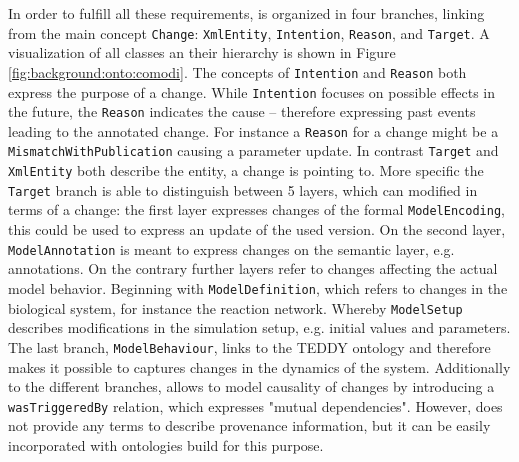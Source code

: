 	In order to fulfill all these requirements, \comodi is organized in four branches, linking from the main concept \texttt{Change}: \texttt{XmlEntity}, \texttt{Intention}, \texttt{Reason}, and \texttt{Target}. A visualization of all classes an their hierarchy is shown in Figure \ref{fig:background:onto:comodi}.
	The concepts of \texttt{Intention} and \texttt{Reason} both express the purpose of a change. While \texttt{Intention} focuses on possible effects in the future, the \texttt{Reason} indicates the cause -- therefore expressing past events leading to the annotated change. For instance a \texttt{Reason} for a change might be a \texttt{MismatchWithPublication} causing a parameter update.
	In contrast \texttt{Target} and \texttt{XmlEntity} both describe the entity, a change is pointing to.
	More specific the \texttt{Target} branch is able to distinguish between 5 layers, which can modified in terms of a change: the first layer expresses changes of the formal \texttt{ModelEncoding}, this could be used to express an update of the used \sbml version.
	On the second layer, \texttt{ModelAnnotation} is meant to express changes on the semantic layer, e.g. annotations. 
	On the contrary further layers refer to changes affecting the actual model behavior. Beginning with \texttt{ModelDefinition}, which refers to changes in the biological system, for instance the reaction network. Whereby \texttt{ModelSetup} describes modifications in the simulation setup, e.g. initial values and parameters. The last branch, \texttt{ModelBehaviour}, links to the TEDDY ontology \citep{Courtot2011} and therefore makes it possible to captures changes in the dynamics of the system.
	Additionally to the different branches, \comodi allows to model causality of changes by introducing a \texttt{wasTriggeredBy} relation, which expresses "mutual dependencies". However, \comodi does not provide any terms to describe provenance information, but it can be easily incorporated with ontologies build for this purpose.
	
